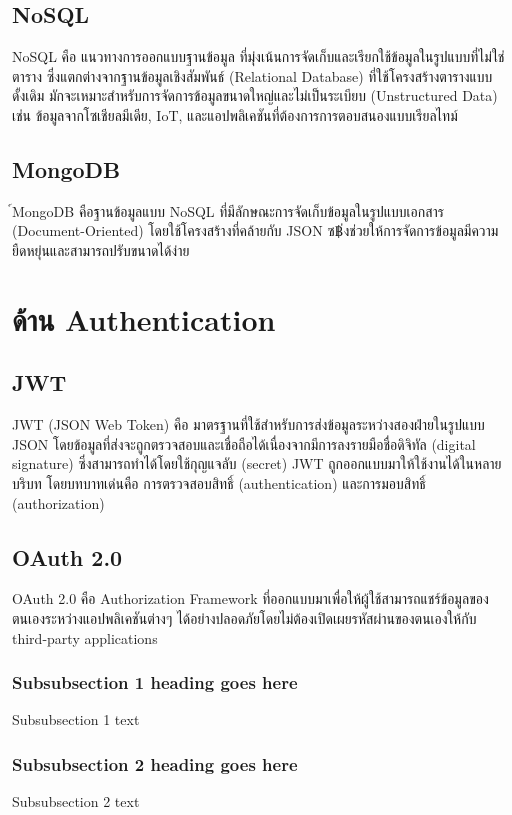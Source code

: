 \subsection{NoSQL}
NoSQL คือ แนวทางการออกแบบฐานข้อมูล ที่มุ่งเน้นการจัดเก็บและเรียกใช้ข้อมูลในรูปแบบที่ไม่ใช่ตาราง ซึ่งแตกต่างจากฐานข้อมูลเชิงสัมพันธ์ (Relational Database) ที่ใช้โครงสร้างตารางแบบดั้งเดิม
มักจะเหมาะสำหรับการจัดการข้อมูลขนาดใหญ่และไม่เป็นระเบียบ (Unstructured Data) เช่น ข้อมูลจากโซเชียลมีเดีย, IoT, และแอปพลิเคชันที่ต้องการการตอบสนองแบบเรียลไทม์ \cite{nosql}
\subsection{MongoDB}
์MongoDB คือฐานข้อมูลแบบ NoSQL ที่มีลักษณะการจัดเก็บข้อมูลในรูปแบบเอกสาร (Document-Oriented) โดยใช้โครงสร้างที่คล้ายกับ JSON ซ฿่งช่วยให้การจัดการข้อมูลมีความยืดหยุ่นและสามารถปรับขนาดได้ง่าย \cite{mongodb}

\section{ด้าน Authentication}
\subsection{JWT}
JWT (JSON Web Token) คือ มาตรฐานที่ใช้สำหรับการส่งข้อมูลระหว่างสองฝ่ายในรูปแบบ JSON โดยข้อมูลที่ส่งจะถูกตรวจสอบและเชื่อถือได้เนื่องจากมีการลงรายมือชื่อดิจิทัล (digital signature) ซึ่งสามารถทำได้โดยใช้กุญแจลับ (secret)
JWT ถูกออกแบบมาให้ใช้งานได้ในหลายบริบท โดยบทบาทเด่นคือ การตรวจสอบสิทธิ์ (authentication) และการมอบสิทธิ์ (authorization) \cite{jwt1}\cite{jwt2}
\subsection{OAuth 2.0}
OAuth 2.0 คือ Authorization Framework ที่ออกแบบมาเพื่อให้ผู้ใช้สามารถแชร์ข้อมูลของตนเองระหว่างแอปพลิเคชันต่างๆ ได้อย่างปลอดภัยโดยไม่ต้องเปิดเผยรหัสผ่านของตนเองให้กับ third-party applications \cite{oauth1}\cite{oauth2}

\subsubsection{Subsubsection 1 heading goes here}
Subsubsection 1 text

\subsubsection{Subsubsection 2 heading goes here}
Subsubsection 2 text

